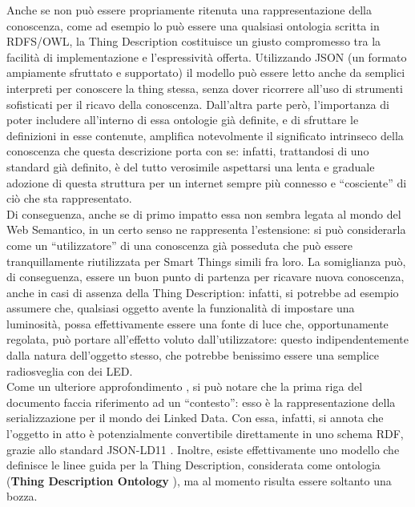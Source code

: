 \documentclass[12pt,a4paper,openright,oneside]{report}
\newcommand{\quotes}[1]{``#1''}
\begin{document}
Anche se non può essere propriamente ritenuta una rappresentazione della conoscenza, come ad esempio lo può essere una qualsiasi ontologia scritta in RDFS/OWL, la Thing Description costituisce un giusto compromesso tra la facilità di implementazione e l'espressività offerta. Utilizzando JSON (un formato ampiamente sfruttato e supportato) il modello può essere letto anche da semplici interpreti per conoscere la thing stessa, senza dover ricorrere all'uso di strumenti sofisticati per il ricavo della conoscenza. Dall'altra parte però, l'importanza di poter includere all'interno di essa ontologie già definite, e di sfruttare le definizioni in esse contenute, amplifica notevolmente il significato intrinseco della conoscenza che questa descrizione porta con se: infatti, trattandosi di uno standard già definito, è del tutto verosimile aspettarsi una lenta e graduale adozione di questa struttura per un internet sempre più connesso e \quotes{cosciente} di ciò che sta rappresentato.\\

Di conseguenza, anche se di primo impatto essa non sembra legata al mondo del Web Semantico, in un certo senso ne rappresenta l'estensione: si può considerarla come un \quotes{utilizzatore} di una conoscenza già posseduta che può essere tranquillamente riutilizzata per Smart Things simili fra loro. La somiglianza può, di conseguenza, essere un buon punto di partenza per ricavare nuova conoscenza, anche in casi di assenza della Thing Description: infatti, si potrebbe ad esempio assumere che, qualsiasi oggetto avente la funzionalità di impostare una luminosità, possa effettivamente essere una fonte di luce che, opportunamente regolata, può portare all'effetto voluto dall'utilizzatore: questo indipendentemente dalla natura dell'oggetto stesso, che potrebbe benissimo essere una semplice radiosveglia con dei LED.\\

Come un ulteriore approfondimento \cite{td-paper}, si può notare che la prima riga del documento faccia riferimento ad un \quotes{contesto}: esso è la rappresentazione della serializzazione per il mondo dei Linked Data. Con essa, infatti, si annota che l'oggetto in atto è potenzialmente convertibile direttamente in uno schema RDF, grazie allo standard JSON-LD11 \cite{json-ld}. Inoltre, esiste effettivamente uno modello che definisce le linee guida per la Thing Description, considerata come ontologia (\textbf{Thing Description Ontology} \cite{td-ontology}), ma al momento risulta essere soltanto una bozza.\\
\end{document}
